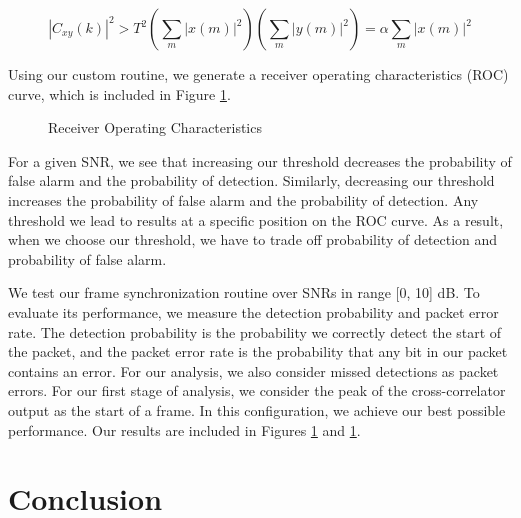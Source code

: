 \documentclass{article}
\begin{document}
\begin{equation}
	|C_{xy}(k)|^2 > T^2\left(\sum_m{|x(m)|^2}\right)\left(\sum_m{|y(m)|^2}\right) = \alpha\sum_m{|x(m)|^2}
\end{equation}

\noindent Using our custom routine, we generate a receiver operating characteristics (ROC) curve, which is included in Figure \ref{fig::roc_curve}.

\begin{figure}[H]
	\centerline{}
	\caption{Receiver Operating Characteristics}
	\label{fig::roc_curve}
\end{figure}

\noindent For a given SNR, we see that increasing our threshold decreases the probability of false alarm and the probability of detection. Similarly, decreasing our threshold increases the probability of false alarm and the probability of detection. Any threshold we lead to results at a specific position on the ROC curve. As a result, when we choose our threshold, we have to trade off probability of detection and probability of false alarm.

We test our frame synchronization routine over SNRs in range [0, 10] dB. To evaluate its performance, we measure the detection probability and packet error rate. The detection probability is the probability we correctly detect the start of the packet, and the packet error rate is the probability that any bit in our packet contains an error. For our analysis, we also consider missed detections as packet errors. For our first stage of analysis, we consider the peak of the cross-correlator output as the start of a frame. In this configuration, we achieve our best possible performance. Our results are included in Figures \ref{} and \ref{}.

\section{Conclusion}


{}
\end{document}
